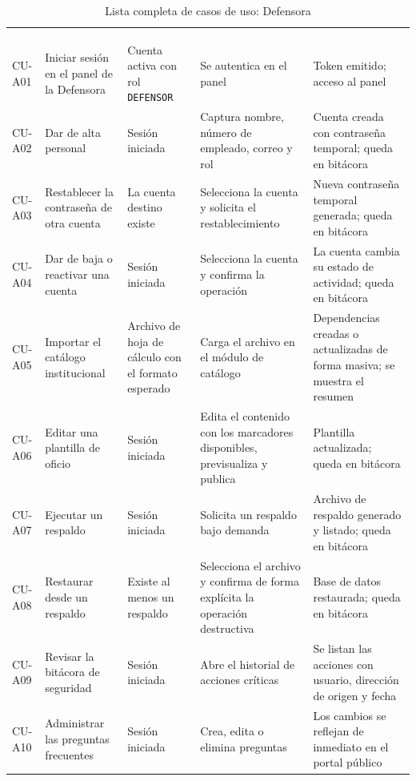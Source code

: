 \footnotesize
\renewcommand{\arraystretch}{1.2}
\setlength{\tabcolsep}{4pt}
\begin{longtable}{|L{1.6cm}|L{3.0cm}|L{2.9cm}|L{4.2cm}|L{3.5cm}|}
	\hiderowcolors\caption{Lista completa de casos de uso: Defensora}
	\label{tab:anx_cu_admin} \\ \showrowcolors
	\hline
	 &  &  &  &  \\
	\hline
	\endfirsthead
	\hline
	 &  &  &  &  \\
	\hline
	\endhead
	CU-A01 & Iniciar sesión en el panel de la Defensora & Cuenta activa con rol \texttt{DEFENSOR} & Se autentica en el panel & Token emitido; acceso al panel \\ \hline
	CU-A02 & Dar de alta personal & Sesión iniciada & Captura nombre, número de empleado, correo y rol & Cuenta creada con contraseña temporal; queda en bitácora \\ \hline
	CU-A03 & Restablecer la contraseña de otra cuenta & La cuenta destino existe & Selecciona la cuenta y solicita el restablecimiento & Nueva contraseña temporal generada; queda en bitácora \\ \hline
	CU-A04 & Dar de baja o reactivar una cuenta & Sesión iniciada & Selecciona la cuenta y confirma la operación & La cuenta cambia su estado de actividad; queda en bitácora \\ \hline
	CU-A05 & Importar el catálogo institucional & Archivo de hoja de cálculo con el formato esperado & Carga el archivo en el módulo de catálogo & Dependencias creadas o actualizadas de forma masiva; se muestra el resumen \\ \hline
	CU-A06 & Editar una plantilla de oficio & Sesión iniciada & Edita el contenido con los marcadores disponibles, previsualiza y publica & Plantilla actualizada; queda en bitácora \\ \hline
	CU-A07 & Ejecutar un respaldo & Sesión iniciada & Solicita un respaldo bajo demanda & Archivo de respaldo generado y listado; queda en bitácora \\ \hline
	CU-A08 & Restaurar desde un respaldo & Existe al menos un respaldo & Selecciona el archivo y confirma de forma explícita la operación destructiva & Base de datos restaurada; queda en bitácora \\ \hline
	CU-A09 & Revisar la bitácora de seguridad & Sesión iniciada & Abre el historial de acciones críticas & Se listan las acciones con usuario, dirección de origen y fecha \\ \hline
	CU-A10 & Administrar las preguntas frecuentes & Sesión iniciada & Crea, edita o elimina preguntas & Los cambios se reflejan de inmediato en el portal público \\ \hline
\end{longtable}
\normalsize
\setlength{\tabcolsep}{6pt}
\renewcommand{\arraystretch}{1}

